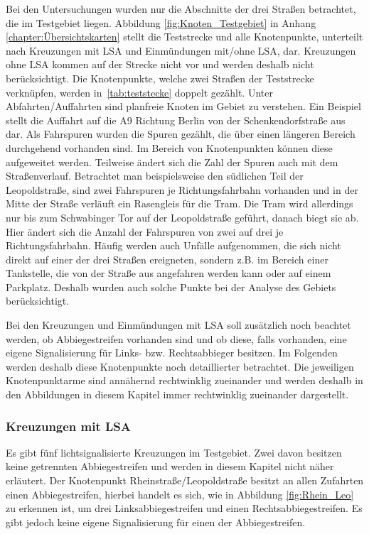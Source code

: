 Bei den Untersuchungen wurden nur die Abschnitte der drei Straßen betrachtet, die im Testgebiet liegen. Abbildung \ref{fig:Knoten_Testgebiet} in Anhang \ref{chapter:Übersichtskarten} stellt die Teststrecke und alle Knotenpunkte, unterteilt nach Kreuzungen mit LSA und Einmündungen mit/ohne LSA, dar. Kreuzungen ohne LSA kommen auf der Strecke nicht vor und werden deshalb nicht berücksichtigt. Die Knotenpunkte, welche zwei Straßen der Teststrecke verknüpfen, werden in~\autoref{tab:teststecke} doppelt gezählt. Unter Abfahrten/Auffahrten sind planfreie Knoten im Gebiet zu verstehen. Ein Beispiel stellt die Auffahrt auf die A9 Richtung Berlin von der Schenkendorfstraße aus dar. Als Fahrspuren wurden die Spuren gezählt, die über einen längeren Bereich durchgehend vorhanden sind. Im Bereich von Knotenpunkten können diese aufgeweitet werden. Teilweise ändert sich die Zahl der Spuren auch mit dem Straßenverlauf. Betrachtet man beispielsweise den südlichen Teil der Leopoldstraße, sind zwei Fahrspuren je Richtungsfahrbahn vorhanden und in der Mitte der Straße verläuft ein Rasengleis für die Tram. Die Tram wird allerdings nur bis zum Schwabinger Tor auf der Leopoldstraße geführt, danach biegt sie ab. Hier ändert sich die Anzahl der Fahrspuren von zwei auf drei je Richtungsfahrbahn. Häufig werden auch Unfälle aufgenommen, die sich nicht direkt auf einer der drei Straßen ereigneten, sondern z.B. im Bereich einer Tankstelle, die von der Straße aus angefahren werden kann oder auf einem Parkplatz. Deshalb wurden auch solche Punkte bei der Analyse des Gebiets berücksichtigt.

Bei den Kreuzungen und Einmündungen mit LSA soll zusätzlich noch beachtet werden, ob Abbiegestreifen vorhanden sind und ob diese, falls vorhanden, eine eigene Signalisierung für Links- bzw. Rechtsabbieger besitzen. Im Folgenden werden deshalb diese Knotenpunkte noch detaillierter betrachtet. Die jeweiligen Knotenpunktarme sind annähernd rechtwinklig zueinander und werden deshalb in den Abbildungen in diesem Kapitel immer rechtwinklig zueinander dargestellt.

\subsubsection{Kreuzungen mit LSA}
Es gibt fünf lichtsignalisierte Kreuzungen im Testgebiet. Zwei davon besitzen keine getrennten Abbiegestreifen und werden in diesem Kapitel nicht näher erläutert. Der Knotenpunkt Rheinstraße/Leopoldstraße besitzt an allen Zufahrten einen Abbiegestreifen, hierbei handelt es sich, wie in Abbildung \ref{fig:Rhein_Leo} zu erkennen ist, um drei Linksabbiegestreifen und einen Rechtsabbiegestreifen. Es gibt jedoch keine eigene Signalisierung für einen der Abbiegestreifen. 

